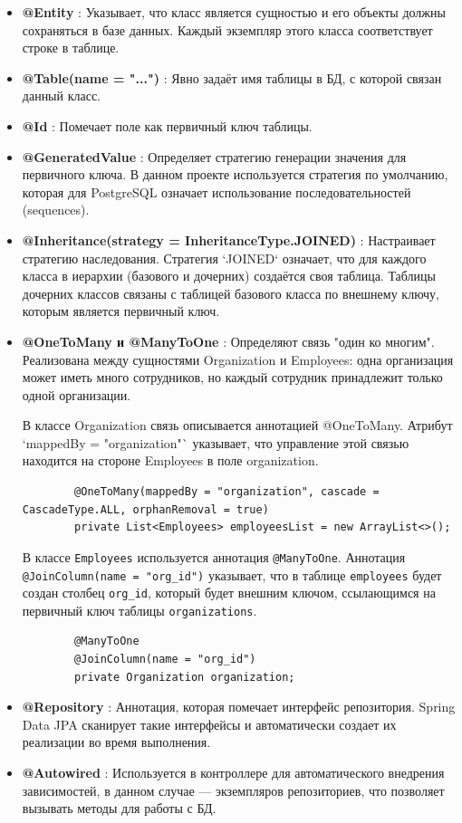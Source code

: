 \documentclass[oneside,a4paper,14pt]{extarticle}
\begin{document}
\begin{itemize}
    \item \textbf{@Entity }: Указывает, что класс является сущностью и его объекты должны сохраняться в базе данных. Каждый экземпляр этого класса соответствует строке в таблице.
    \item \textbf{@Table(name = "...") }: Явно задаёт имя таблицы в БД, с которой связан данный класс.
    \item \textbf{@Id }: Помечает поле как первичный ключ таблицы.
    \item \textbf{@GeneratedValue }: Определяет стратегию генерации значения для первичного ключа. В данном проекте используется стратегия по умолчанию, которая для PostgreSQL означает использование последовательностей (sequences).
    \item \textbf{@Inheritance(strategy = InheritanceType.JOINED) }: Настраивает стратегию наследования. Стратегия `JOINED` означает, что для каждого класса в иерархии (базового и дочерних) создаётся своя таблица. Таблицы дочерних классов связаны с таблицей базового класса по внешнему ключу, которым является первичный ключ.
    \item \textbf{@OneToMany и @ManyToOne }: Определяют связь "один ко многим". Реализована между сущностями Organization и Employees: одна организация может иметь много сотрудников, но каждый сотрудник принадлежит только одной организации.

    В классе Organization связь описывается аннотацией @OneToMany. Атрибут `mappedBy = "organization"` указывает, что управление этой связью находится на стороне Employees в поле organization.

    \begin{lstlisting}
        @OneToMany(mappedBy = "organization", cascade = CascadeType.ALL, orphanRemoval = true)
        private List<Employees> employeesList = new ArrayList<>();
    \end{lstlisting}

    В классе \texttt{Employees} используется аннотация \texttt{@ManyToOne}.
    Аннотация \texttt{@JoinColumn(name = "org\_id")} указывает, что в таблице
    \texttt{employees} будет создан столбец \texttt{org\_id}, который будет
    внешним ключом, ссылающимся на первичный ключ таблицы \texttt{organizations}.
    \begin{lstlisting}
        @ManyToOne
        @JoinColumn(name = "org_id")
        private Organization organization;
    \end{lstlisting}

    \item \textbf{@Repository }: Аннотация, которая помечает интерфейс репозитория. Spring Data JPA сканирует такие интерфейсы и автоматически создает их реализации во время выполнения.
    \item \textbf{@Autowired }: Используется в контроллере для автоматического внедрения зависимостей, в данном случае — экземпляров репозиториев, что позволяет вызывать методы для работы с БД.
\end{itemize}
\end{document}
